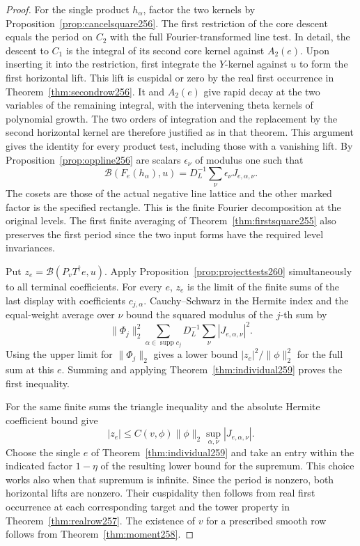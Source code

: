 \documentclass[a4paper,11pt]{article}
\theoremstyle{definition}
\theoremstyle{remark}
\numberwithin{equation}{section}
\begin{document}
\begin{proof}
For the single product \(h_\alpha\), factor the two kernels by
Proposition~\ref{prop:cancelsquare256}. The first restriction
of the core descent equals the period on \(C_2\) with the full
Fourier-transformed line test. In detail, the descent to \(C_1\)
is the integral of its second core kernel against \(A_2(e)\).
Upon inserting it into the restriction, first integrate the
\(Y\)-kernel against \(u\) to form the first horizontal lift.
This lift is cuspidal or zero by the real first occurrence in
Theorem~\ref{thm:secondrow256}. It and \(A_2(e)\) give rapid
decay at the two variables of the remaining integral, with the
intervening theta kernels of polynomial growth. The two orders
of integration and the replacement by the second horizontal
kernel are therefore justified as in that theorem. This
argument gives the identity for every product test, including
those with a vanishing lift. By
Proposition~\ref{prop:oppline256} are scalars
\(\epsilon_\nu\) of modulus one such that
\[
 \mathcal B(F_e(h_\alpha),u)
     =D_L^{-1}\sum_\nu \epsilon_\nu J_{e,\alpha,\nu}.
\]
The cosets are those of the actual negative line lattice and
the other marked factor is the specified rectangle. This is
the finite Fourier decomposition at the original levels.
The first finite averaging of Theorem~\ref{thm:firstsquare255}
also preserves the first period since the two input forms
have the required level invariances.

Put \(z_e=\mathcal B(P_vT^\dagger e,u)\). Apply
Proposition~\ref{prop:projecttests260} simultaneously to all
terminal coefficients. For every \(e\), \(z_e\) is the limit
of the finite sums of the last display with coefficients
\(c_{j,\alpha}\). Cauchy--Schwarz in the Hermite index and
the equal-weight average over \(\nu\) bound the squared
modulus of the \(j\)-th sum by
\[
 \|\Phi_j\|_2^2\sum_{\alpha\in\operatorname{supp}c_j}
                           D_L^{-1}\sum_\nu|J_{e,\alpha,\nu}|^2 .
\]
Using the upper limit for \(\|\Phi_j\|_2\) gives a lower
bound \(|z_e|^2/\|\phi\|_2^2\) for the full sum at this \(e\).
Summing and applying Theorem~\ref{thm:individual259} proves
the first inequality.

For the same finite sums the triangle inequality and the
absolute Hermite coefficient bound give
\[
 |z_e|\le C(v,\phi)\|\phi\|_2\sup_{\alpha,\nu}|J_{e,\alpha,\nu}|.
\]
Choose the single \(e\) of Theorem~\ref{thm:individual259}
and take an entry within the indicated factor \(1-\eta\) of
the resulting lower bound for the supremum. This choice works
also when that supremum is infinite. Since the period is
nonzero, both horizontal lifts are nonzero. Their cuspidality
then follows from real first occurrence at each corresponding
target and the tower property in Theorem~\ref{thm:realrow257}.
The existence of \(v\) for a prescribed smooth row follows from
Theorem~\ref{thm:moment258}.
\end{proof}
\end{document}

